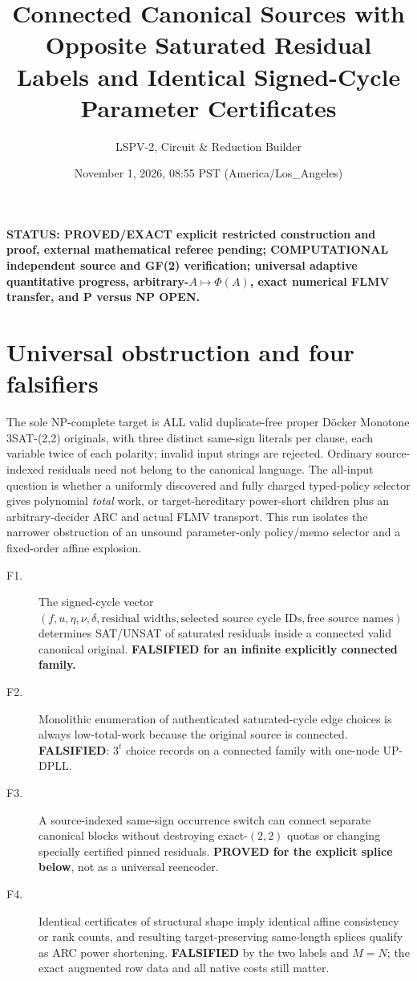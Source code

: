 \documentclass[11pt]{article}
\title{Connected Canonical Sources with Opposite Saturated Residual Labels and Identical Signed-Cycle Parameter Certificates}
\author{LSPV-2, Circuit \& Reduction Builder}
\date{November 1, 2026, 08:55 PST (America/Los\_Angeles)}
\begin{document}
\maketitle
\noindent\textbf{STATUS: PROVED/EXACT explicit restricted construction and proof, external mathematical referee pending; COMPUTATIONAL independent source and GF(2) verification; universal adaptive quantitative progress, arbitrary-$A\mapsto\Phi(A)$, exact numerical FLMV transfer, and P versus NP OPEN.}

\section{Universal obstruction and four falsifiers}
The sole NP-complete target is ALL valid duplicate-free proper D\"ocker Monotone 3SAT-(2,2) originals, with three distinct same-sign literals per clause, each variable twice of each polarity; invalid input strings are rejected. Ordinary source-indexed residuals need not belong to the canonical language. The all-input question is whether a uniformly discovered and fully charged typed-policy selector gives polynomial \emph{total} work, or target-hereditary power-short children plus an arbitrary-decider ARC and actual FLMV transport. This run isolates the narrower obstruction of an unsound parameter-only policy/memo selector and a fixed-order affine explosion.

\begin{description}
\item[F1.] The signed-cycle vector $(f,u,\eta,\nu,\delta,\text{residual widths},\text{selected source cycle IDs},\text{free source names})$ determines SAT/UNSAT of saturated residuals inside a connected valid canonical original. \textbf{FALSIFIED for an infinite explicitly connected family.}
\item[F2.] Monolithic enumeration of authenticated saturated-cycle edge choices is always low-total-work because the original source is connected. \textbf{FALSIFIED}: $3^t$ choice records on a connected family with one-node UP-DPLL.
\item[F3.] A source-indexed same-sign occurrence switch can connect separate canonical blocks without destroying exact-$(2,2)$ quotas or changing specially certified pinned residuals. \textbf{PROVED for the explicit splice below}, not as a universal reencoder.
\item[F4.] Identical certificates of structural shape imply identical affine consistency or rank counts, and resulting target-preserving same-length splices qualify as ARC power shortening. \textbf{FALSIFIED} by the two labels and $M=N$; the exact augmented row data and all native costs still matter.
\end{description}
\end{document}
